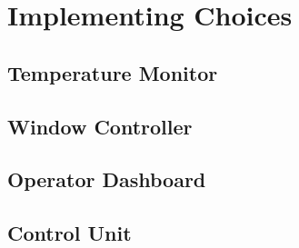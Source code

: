 \documentclass[a4paper,12pt]{report}
\begin{document}
	\chapter{Implementing Choices}
	\section{Temperature Monitor}
	\section{Window Controller}
	\section{Operator Dashboard}
	\section{Control Unit}
	
\end{document}
